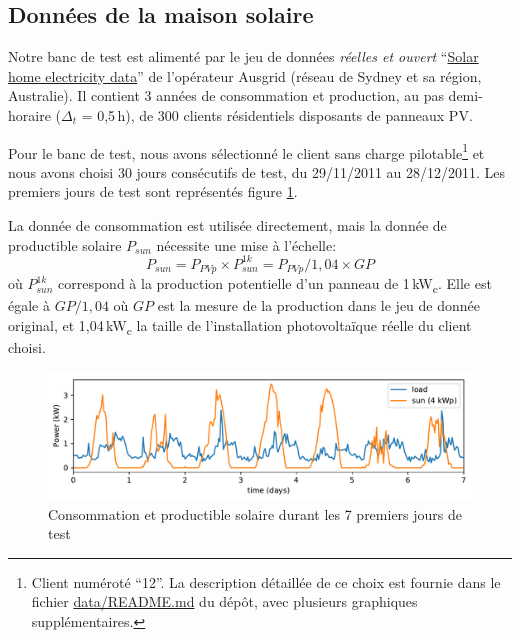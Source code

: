 \documentclass[a4paper,10pt,twocolumn]{article}
\newcommand\sub[1]{\textsubscript{#1}}
\newcommand\kWc{kW\sub{c}{}} %
\begin{document}
\subsection{Données de la maison solaire}
\label{ss:sol_data}

Notre banc de test est alimenté par le jeu de données \emph{réelles et ouvert}
``\href{https://www.ausgrid.com.au/Common/About-us/Corporate-information/Data-to-share/Solar-home-electricity-data.aspx}{Solar home electricity data}''
de l'opérateur Ausgrid (réseau de Sydney et sa région, Australie).
Il contient 3 années de consommation et production, au pas demi-horaire ($\Delta_t$ = 0,5\,h),
de 300 clients résidentiels disposants de panneaux PV.

Pour le banc de test, nous avons sélectionné le client sans charge pilotable\footnote{
  Client numéroté ``12''. La description détaillée de ce choix est fournie dans le fichier \href{https://github.com/pierre-haessig/solarhome-control-bench/blob/master/data/README.md}{data/README.md} du dépôt, avec plusieurs graphiques supplémentaires.
}
et nous avons choisi 30 jours consécutifs de test, du 29/11/2011 au 28/12/2011.
Les premiers jours de test sont représentés figure \ref{fig:testdata}.

La donnée de consommation est utilisée directement, mais
la donnée de productible solaire $P_{sun}$ nécessite une mise à l'échelle:
\begin{equation}
  P_{sun} = P_{PVp} \times P_{sun}^{1k} = P_{PVp}/1,04 \times GP 
\end{equation}
%
où $P_{sun}^{1k}$ correspond à la production potentielle d'un panneau de 1\,\kWc.
Elle est égale à $GP/1,04$ où $GP$ est la mesure de la production
dans le jeu de donnée original, et 1,04\,\kWc{} la taille de l'installation photovoltaïque
réelle du client choisi.

\begin{figure}[!ht]
        \begin{center}
                \includegraphics[width=1\columnwidth]{figures/data_week_2011-11-29.pdf}
        \end{center}

        \caption{Consommation et productible solaire durant les 7 premiers jours de test
        }
        \label{fig:testdata}
\end{figure}
\end{document}
